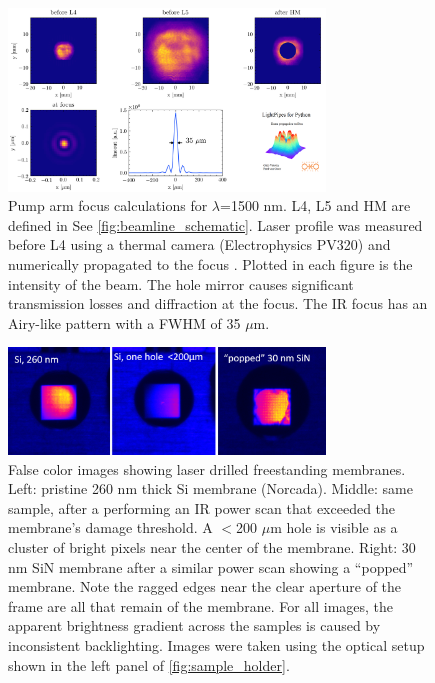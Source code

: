 \begin{figure}
	\centering
	\includegraphics[width=0.75\textwidth]{figures/chap3/pump_on_focus_calculation.png}
	\caption{Pump arm focus calculations for $\lambda$=1500 nm. L4, L5 and HM are defined in See \cref{fig:beamline_schematic}. Laser profile was measured before L4 using a thermal camera (Electrophysics PV320) and numerically propagated to the focus \cite{vdovinLightPipesPython}. Plotted in each figure is the intensity of the beam. The hole mirror causes significant transmission losses and diffraction at the focus. The IR focus has an Airy-like pattern with a FWHM of 35 $\mu$m.}
	\label{fig:pump_on_focus_calculation}
\end{figure}

\begin{figure}
	\centering
	\includegraphics[width=0.75\textwidth]{figures/chap3/sample_damage.png}
	\caption{False color images showing laser drilled freestanding membranes. Left: pristine 260 nm thick Si membrane (Norcada). Middle: same sample, after a performing an IR power scan that exceeded the membrane's damage threshold. A $<$200 $\mu$m hole is visible as a cluster of bright pixels near the center of the membrane. Right: 30 nm SiN membrane after a similar power scan showing a ``popped'' membrane. Note the ragged edges near the clear aperture of the frame are all that remain of the membrane. For all images, the apparent brightness gradient across the samples is caused by inconsistent backlighting. Images were taken using the optical setup shown in the left panel of \cref{fig:sample_holder}.}
	\label{fig:sample_damage}
\end{figure}

